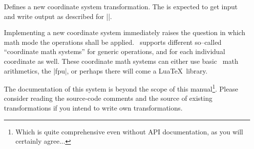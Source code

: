 \begin{command}{\pgfplotsdefinecstransform{}}
	Defines a new coordinate system transformation. The  is expected to get input and write output as described for |\pgfplotsaxistransformcs|.

	Implementing a new coordinate system immediately raises the question in which math mode the operations shall be applied. \PGFPlots\ supports different so--called ``coordinate math systems'' for generic operations, and for each individual coordinate as well. These coordinate math systems can either use basic \PGF\ math arithmetics, the |fpu|, or perhaps there will come a Lua\TeX\ library.

	The documentation of this system is beyond the scope of this manual\footnote{Which is quite comprehensive even without API documentation, as you will certainly agree...}. Please consider reading the source-code comments and the source of existing transformations if you intend to write own transformations.
\end{command}
